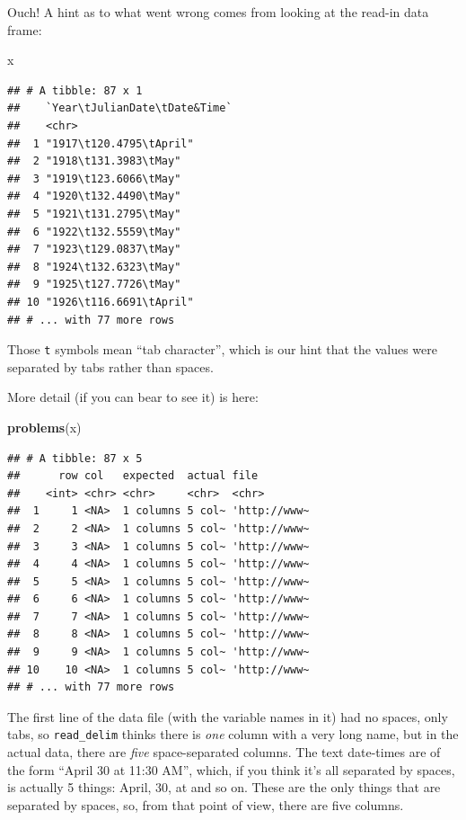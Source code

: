 \documentclass[]{tufte-book}
\newenvironment{Shaded}{}{}
\newcommand{\KeywordTok}[1]{\textcolor[rgb]{0.00,0.44,0.13}{\textbf{#1}}}
\newcommand{\NormalTok}[1]{#1}
\theoremstyle{definition}
\theoremstyle{definition}
\theoremstyle{definition}
\theoremstyle{remark}
\begin{document}
Ouch! A hint as to what went wrong comes from looking at the read-in
data frame:

\begin{Shaded}
\begin{Highlighting}[]
\NormalTok{x}
\end{Highlighting}
\end{Shaded}

\begin{verbatim}
## # A tibble: 87 x 1
##    `Year\tJulianDate\tDate&Time`
##    <chr>                        
##  1 "1917\t120.4795\tApril"      
##  2 "1918\t131.3983\tMay"        
##  3 "1919\t123.6066\tMay"        
##  4 "1920\t132.4490\tMay"        
##  5 "1921\t131.2795\tMay"        
##  6 "1922\t132.5559\tMay"        
##  7 "1923\t129.0837\tMay"        
##  8 "1924\t132.6323\tMay"        
##  9 "1925\t127.7726\tMay"        
## 10 "1926\t116.6691\tApril"      
## # ... with 77 more rows
\end{verbatim}

Those \texttt{t} symbols mean ``tab character'', which is our hint that
the values were separated by tabs rather than spaces.

More detail (if you can bear to see it) is here:

\begin{Shaded}
\begin{Highlighting}[]
\KeywordTok{problems}\NormalTok{(x)}
\end{Highlighting}
\end{Shaded}

\begin{verbatim}
## # A tibble: 87 x 5
##      row col   expected  actual file        
##    <int> <chr> <chr>     <chr>  <chr>       
##  1     1 <NA>  1 columns 5 col~ 'http://www~
##  2     2 <NA>  1 columns 5 col~ 'http://www~
##  3     3 <NA>  1 columns 5 col~ 'http://www~
##  4     4 <NA>  1 columns 5 col~ 'http://www~
##  5     5 <NA>  1 columns 5 col~ 'http://www~
##  6     6 <NA>  1 columns 5 col~ 'http://www~
##  7     7 <NA>  1 columns 5 col~ 'http://www~
##  8     8 <NA>  1 columns 5 col~ 'http://www~
##  9     9 <NA>  1 columns 5 col~ 'http://www~
## 10    10 <NA>  1 columns 5 col~ 'http://www~
## # ... with 77 more rows
\end{verbatim}

The first line of the data file (with the variable names in it) had no
spaces, only tabs, so \texttt{read\_delim} thinks there is \emph{one}
column with a very long name, but in the actual data, there are
\emph{five} space-separated columns. The text date-times are of the form
``April 30 at 11:30 AM'', which, if you think it's all separated by
spaces, is actually 5 things: April, 30, at and so on. These are the
only things that are separated by spaces, so, from that point of view,
there are five columns.
\end{document}

